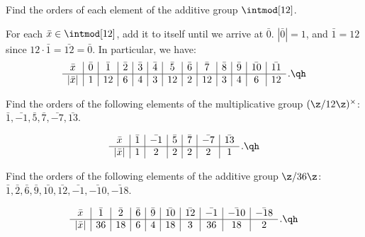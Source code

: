 \begin{exercise}\label{ex1.1.11}
    Find the orders of each element of the additive group $\intmod[12]$.
\end{exercise}

\begin{sol}
    For each $\bar x \in \intmod[12]$, add it to itself until we arrive at $\bar 0$. $|\bar 0| = 1$, and $\bar 1 = 12$ since $12 \cdot \bar 1 = \bar{12} = \bar 0$. In particular, we have:
    \[\begin{array}{c|c|c|c|c|c|c|c|c|c|c|c|c}
        \bar x & \bar 0 & \bar 1 & \bar 2 & \bar 3 & \bar 4 & \bar 5 & \bar 6 & \bar 7 & \bar 8 & \bar 9 & \bar{10} & \bar{11} \\
        \hline
        |\bar x| & 1 & 12 & 6 & 4 & 3 & 12 & 2 & 12 & 3 & 4 & 6 & 12
    \end{array}\,. \qh\]
\end{sol}

\begin{exercise}\label{ex1.1.12}
    Find the orders of the following elements of the multiplicative group $(\z/12\z)^{\times}$: $\bar{1}, \bar{-1}, \bar{5}, \bar{7}, \bar{-7}, \bar{13}$.
\end{exercise}

\begin{sol}
    \[\begin{array}{c|c|c|c|c|c|c}
        \bar x & \bar{1} & \bar{-1} & \bar{5} & \bar{7} & \bar{-7} & \bar{13} \\
        \hline
        |\bar x| & 1 & 2 & 2 & 2 & 2 & 1
    \end{array}\,. \qh\]
\end{sol}

\begin{exercise}\label{ex1.1.13}
    Find the orders of the following elements of the additive group $\z/36\z$: $\bar{1}, \bar{2}, \bar{6}, \bar{9}, \bar{10}, \bar{12}, \bar{-1}, \bar{-10}, \bar{-18}$.
\end{exercise}

\begin{sol}
    \[\begin{array}{c|c|c|c|c|c|c|c|c|c}
            \bar x & \bar 1 & \bar 2 & \bar 6 & \bar 9 & \bar{10} & \bar{12} & \bar{-1} & \bar{-10} & \bar{-18} \\
            \hline
            |\bar x| & 36 & 18 & 6 & 4 & 18 & 3 & 36 & 18 & 2
    \end{array}\,. \qh\]
\end{sol}

